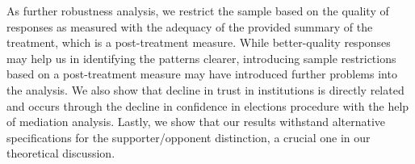 \documentclass[11pt, ngerman,english,a4]{article}
\begin{document}
As further robustness analysis, we restrict the sample based on the quality of responses as measured with the adequacy of the provided summary of the treatment, which is a post-treatment measure. While better-quality responses may help us in identifying the patterns clearer, introducing sample restrictions based on a post-treatment measure may have introduced further problems into the analysis.   
We also show that decline in trust in institutions is directly related and occurs through the decline in confidence in elections procedure with the help of mediation analysis. Lastly, we show that our results withstand alternative specifications for the supporter/opponent distinction, a crucial one in our theoretical discussion.  

%







\end{document}
